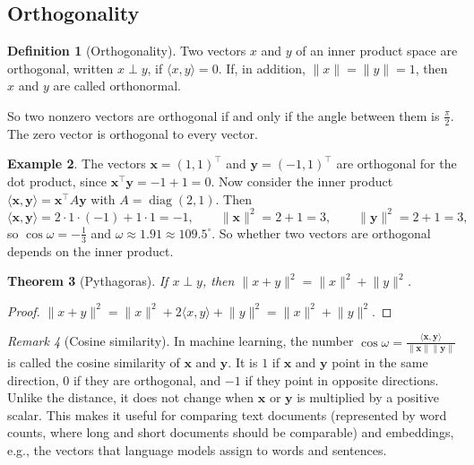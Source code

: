 \documentclass[11pt]{article}
\newcommand{\norm}[1]{\lVert #1 \rVert}
\newcommand{\ip}[2]{\langle #1, #2 \rangle}
\theoremstyle{definition}
\newtheorem{definition}{Definition}[section]
\newtheorem{example}[definition]{Example}
\theoremstyle{plain}
\newtheorem{theorem}[definition]{Theorem}
\theoremstyle{remark}
\newtheorem{remark}[definition]{Remark}
\DeclareMathOperator{\diag}{diag}
\begin{document}
\subsection{Orthogonality}

\begin{definition}[Orthogonality]
    Two vectors $x$ and $y$ of an inner product space are orthogonal, written $x \perp y$, if $\ip{x}{y} = 0$. If, in addition, $\norm{x} = \norm{y} = 1$, then $x$ and $y$ are called orthonormal.
\end{definition}

So two nonzero vectors are orthogonal if and only if the angle between them is $\frac{\pi}{2}$. The zero vector is orthogonal to every vector.

\begin{example}\label{ex:orth-depends}
    The vectors $\mathbf{x} = (1, 1)^\top$ and $\mathbf{y} = (-1, 1)^\top$ are orthogonal for the dot product, since $\mathbf{x}^\top \mathbf{y} = -1 + 1 = 0$. Now consider the inner product $\ip{\mathbf{x}}{\mathbf{y}} = \mathbf{x}^\top A \mathbf{y}$ with $A = \diag(2, 1)$. Then
    \[\ip{\mathbf{x}}{\mathbf{y}} = 2 \cdot 1 \cdot (-1) + 1 \cdot 1 = -1, \qquad \norm{\mathbf{x}}^2 = 2 + 1 = 3, \qquad \norm{\mathbf{y}}^2 = 2 + 1 = 3,\]
    so $\cos\omega = -\frac{1}{3}$ and $\omega \approx 1.91 \approx 109.5^\circ$. So whether two vectors are orthogonal depends on the inner product.
\end{example}

\begin{theorem}[Pythagoras]\label{thm:pythagoras}
    If $x \perp y$, then $\norm{x + y}^2 = \norm{x}^2 + \norm{y}^2$.
\end{theorem}

\begin{proof}
    $\norm{x + y}^2 = \norm{x}^2 + 2\ip{x}{y} + \norm{y}^2 = \norm{x}^2 + \norm{y}^2$.
\end{proof}

\begin{remark}[Cosine similarity]
    In machine learning, the number $\cos\omega = \frac{\ip{\mathbf{x}}{\mathbf{y}}}{\norm{\mathbf{x}} \norm{\mathbf{y}}}$ is called the cosine similarity of $\mathbf{x}$ and $\mathbf{y}$. It is $1$ if $\mathbf{x}$ and $\mathbf{y}$ point in the same direction, $0$ if they are orthogonal, and $-1$ if they point in opposite directions. Unlike the distance, it does not change when $\mathbf{x}$ or $\mathbf{y}$ is multiplied by a positive scalar. This makes it useful for comparing text documents (represented by word counts, where long and short documents should be comparable) and embeddings, e.g., the vectors that language models assign to words and sentences.
\end{remark}
\end{document}
